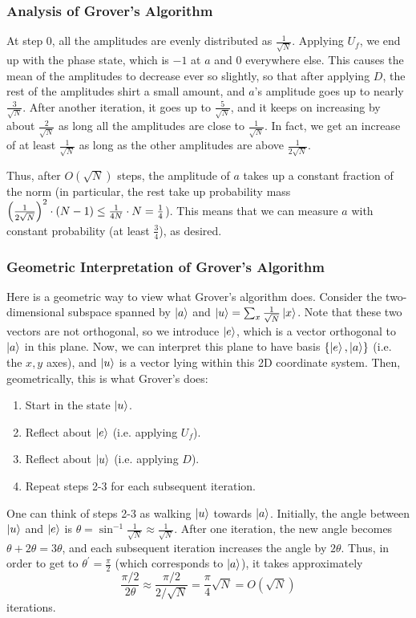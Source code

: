 \subsubsection{Analysis of Grover's Algorithm}

At step 0, all the amplitudes are evenly distributed as $\frac{1}{\sqrt{N}}$. Applying $U_f$, we end up with the phase state,
which is $-1$ at $a$ and 0 everywhere else. This causes the mean of the amplitudes to decrease ever so slightly, so that after applying $D$, the rest of the amplitudes shirt a small amount, and $a$'s amplitude goes up to nearly $\frac{3}{\sqrt{N}}$.
After another iteration, it goes up to $\frac{5}{\sqrt{N}}$, and it keeps on increasing by about $\frac{2}{\sqrt{N}}$
as long all the amplitudes are close to $\frac{1}{\sqrt{N}}$. In fact, we get an increase of at least $\frac{1}{\sqrt{N}}$ as long as the other amplitudes are above $\frac{1}{2\sqrt{N}}$. 

Thus, after $O(\sqrt{N})$
steps, the amplitude of $a$ takes up a constant fraction of the norm (in particular, the rest take up 
probability mass $\qty(\frac{1}{2\sqrt{N}})^2 \cdot (N - 1) \leq \frac{1}{4N} \cdot N = \frac{1}{4}$).
This means that we can measure $a$ with constant probability (at least $\frac{3}{4}$), as desired.

\subsubsection{Geometric Interpretation of Grover's Algorithm}
Here is a geometric way to view what Grover's algorithm does. Consider the two-dimensional subspace spanned by
$\ket{a}$ and $\ket{u} = \sum_x \frac{1}{\sqrt{N}} \ket{x}$. Note that these two vectors are not orthogonal, so we introduce $\ket e$, which is a vector orthogonal to $\ket{a}$ in this plane. 
Now, we can interpret this plane to have basis $\{\ket e, \ket a\}$ (i.e. the $x, y$ axes), and $\ket u$ is a vector lying within this 2D coordinate system. Then, geometrically, this is what Grover's does:
\begin{enumerate}
    \item Start in the state $\ket u$.
    \item Reflect about $\ket e$ (i.e. applying $U_f$).
    \item Reflect about $\ket u$ (i.e. applying $D$).
    \item Repeat steps 2-3 for each subsequent iteration.
\end{enumerate}
One can think of steps 2-3 as walking $\ket{u}$ towards $\ket{a}$. Initially, the angle between $\ket{u}$ and $\ket{e}$ is $\theta = \sin^{-1} \frac{1}{\sqrt{N}} \approx \frac{1}{\sqrt{N}}$.
After one iteration, the new angle becomes $\theta + 2 \theta = 3 \theta$, and each subsequent iteration increases the angle by $2\theta$. Thus, in order to get to $\theta^{\prime} = \frac{\pi}{2}$ (which corresponds to $\ket a$), it takes approximately
\[\frac{\pi /2}{2 \theta} \approx \frac{\pi / 2}{2 / \sqrt{N}} = \frac{\pi}{4} \sqrt{N} = O(\sqrt{N})\]
iterations. 

